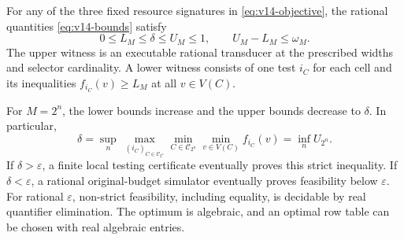 \begin{theorem}\label{thm:v14-local}
For any of the three fixed resource signatures in
\eqref{eq:v14-objective}, the rational quantities
\eqref{eq:v14-bounds} satisfy
\begin{equation}\label{eq:v14-mainbound}
 0\le L_M\le\delta\le U_M\le1,\qquad
 U_M-L_M\le\omega_M.
\end{equation}
The upper witness is an executable rational transducer at the prescribed
widths and selector cardinality. A lower witness consists of one test
$i_C$ for each cell and its inequalities
$f_{i_C}(v)\ge L_M$ at all $v\in V(C)$.

For $M=2^n$, the lower bounds increase and the upper bounds decrease to
$\delta$. In particular,
\begin{equation}\label{eq:v14-complete}
 \delta=\sup_n\ \max_{(i_C)_{C\in\mathcal C_{2^n}}}
           \min_{C\in\mathcal C_{2^n}}\min_{v\in V(C)}f_{i_C}(v)
       =\inf_n U_{2^n}.
\end{equation}
If $\delta>\varepsilon$, a finite local testing certificate eventually
proves this strict inequality. If $\delta<\varepsilon$, a rational
original-budget simulator eventually proves feasibility below
$\varepsilon$. For rational $\varepsilon$, non-strict feasibility,
including equality, is decidable by real quantifier elimination.
The optimum is algebraic, and an optimal row table can be chosen with
real algebraic entries.
\end{theorem}
